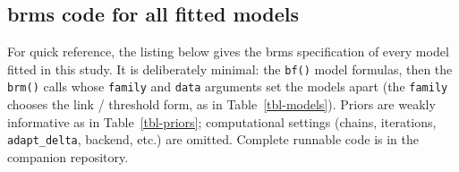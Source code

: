 \documentclass[
  man,
  floatsintext,
  longtable,
  nolmodern,
  notxfonts,
  notimes,
  colorlinks=true,linkcolor=blue,citecolor=blue,urlcolor=blue]{apa7}
\begin{document}
\normalsize

\subsection{brms code for all fitted
models}\label{brms-code-for-all-fitted-models}

For quick reference, the listing below gives the brms specification of
every model fitted in this study. It is deliberately minimal: the
\texttt{bf()} model formulas, then the \texttt{brm()} calls whose
\texttt{family} and \texttt{data} arguments set the models apart (the
\texttt{family} chooses the link / threshold form, as in
Table~\ref{tbl-models}). Priors are weakly informative as in
Table~\ref{tbl-priors}; computational settings (chains, iterations,
\texttt{adapt\_delta}, backend, etc.) are omitted. Complete runnable
code is in the companion repository.

\small
\end{document}
